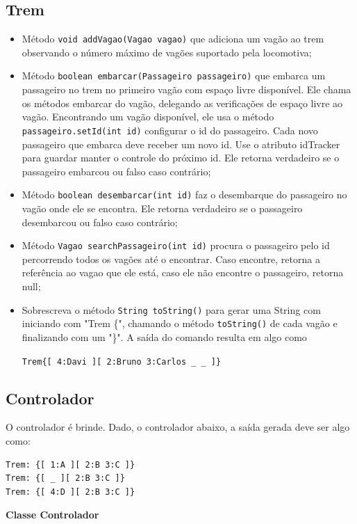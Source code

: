 \documentclass[12pt]{article}
\renewcommand{\tt}[1]{\lstinline|#1|}
\renewcommand{\bf}[1]{\textbf{#1}}
\begin{document}
\subsection{Trem}
\begin{itemize}
\item Método \tt{void addVagao(Vagao vagao)} que adiciona um vagão ao trem observando o número máximo de vagões suportado pela locomotiva;
\item Método \tt{boolean embarcar(Passageiro passageiro)} que embarca um passageiro no trem no primeiro vagão com espaço livre disponível. Ele chama os métodos embarcar
do vagão, delegando as verificações de espaço livre ao vagão. Encontrando um vagão disponível, ele usa o método \tt{passageiro.setId(int id)} configurar o id do passageiro. Cada novo passageiro que embarca deve receber
um novo id. Use o atributo idTracker para guardar manter o controle do próximo id. Ele retorna verdadeiro se o passageiro embarcou ou falso caso contrário;
\item Método \tt{boolean desembarcar(int id)} faz o desembarque do passageiro no vagão onde ele se encontra. Ele retorna verdadeiro se o passageiro desembarcou ou falso caso contrário;
\item Método \tt{Vagao searchPassageiro(int id)} procura o passageiro pelo id percorrendo todos os vagões até o encontrar. Caso encontre, retorna a referência ao vagao que ele está, caso ele não encontre o passageiro, retorna null;
\item Sobrescreva o método \tt{String toString()} para gerar uma String com iniciando com "Trem \{", chamando o método \tt{toString()} de cada vagão e finalizando com um "\}". A saída do comando resulta em algo como 

\verb|Trem{[ 4:Davi ][ 2:Bruno 3:Carlos _ _ ]}|

\end{itemize}

\subsection{Controlador}
O controlador é brinde. Dado, o controlador abaixo, 
a saída gerada deve ser algo como:

\begin{lstlisting}[label=saida, caption=Saida Esperada, float=ht]
Trem: {[ 1:A ][ 2:B 3:C ]}
Trem: {[ _ ][ 2:B 3:C ]}
Trem: {[ 4:D ][ 2:B 3:C ]}
\end{lstlisting}

\pagebreak
\noindent
\bf{Classe Controlador}

\end{document}
